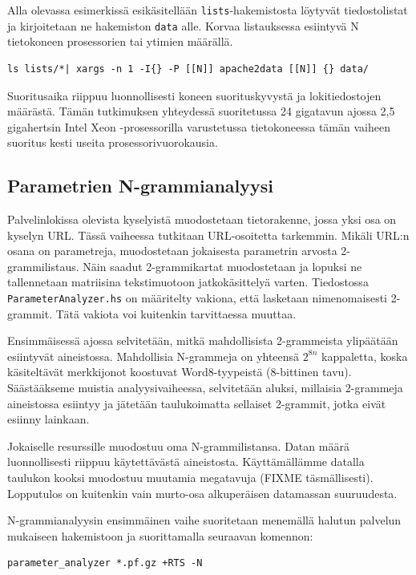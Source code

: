 Alla olevassa esimerkissä esikäsitellään \texttt{lists}-hakemistosta
löytyvät tiedostolistat ja kirjoitetaan ne hakemiston \texttt{data}
alle. Korvaa listauksessa esiintyvä N tietokoneen prosessorien tai
ytimien määrällä. 

\begin{lstlisting}[language=bashshell]
ls lists/*| xargs -n 1 -I{} -P [[N]] apache2data [[N]] {} data/
\end{lstlisting}

Suoritusaika riippuu luonnollisesti koneen suorituskyvystä ja
lokitiedostojen määrästä. Tämän tutkimuksen yhteydessä suoritetussa 24
gigatavun ajossa 2,5 gigahertsin Intel Xeon -prosessorilla varustetussa
tietokoneessa tämän vaiheen suoritus kesti useita
prosessorivuorokausia.

\subsection{Parametrien N-grammianalyysi}

Palvelinlokissa olevista kyselyistä muodostetaan tietorakenne, jossa
yksi osa on kyselyn URL. Tässä vaiheessa tutkitaan URL-osoitetta
tarkemmin. Mikäli URL:n osana on parametreja, muodostetaan jokaisesta
parametrin arvosta 2-grammilistaus. Näin saadut 2-grammikartat
muodostetaan ja lopuksi ne tallennetaan matriisina tekstimuotoon
jatkokäsittelyä varten. Tiedostossa \texttt{ParameterAnalyzer.hs} on
määritelty vakiona, että lasketaan nimenomaisesti 2-grammit. Tätä
vakiota voi kuitenkin tarvittaessa muuttaa.

Ensimmäisessä ajossa selvitetään, mitkä mahdollisista 2-grammeista
ylipäätään esiintyvät aineistossa. Mahdollisia N-grammeja on yhteensä
$2^{8n}$ kappaletta, koska käsiteltävät merkkijonot koostuvat
Word8-tyypeistä (8-bittinen tavu). Säästääkseme muistia
analyysivaiheessa, selvitetään aluksi, millaisia 2-grammeja
aineistossa esiintyy ja jätetään taulukoimatta sellaiset 2-grammit,
jotka eivät esiinny lainkaan.

Jokaiselle resurssille muodostuu oma N-grammilistansa. Datan määrä
luonnollisesti riippuu käytettävästä aineistosta. Käyttämällämme
datalla taulukon kooksi muodostuu muutamia megatavuja (FIXME täsmällisesti).
Lopputulos on kuitenkin vain murto-osa alkuperäisen datamassan
suuruudesta.

N-grammianalyysin ensimmäinen vaihe suoritetaan menemällä halutun
palvelun mukaiseen hakemistoon ja suorittamalla seuraavan komennon:

\begin{lstlisting}[language=bashshell]
parameter_analyzer *.pf.gz +RTS -N
\end{lstlisting} 

